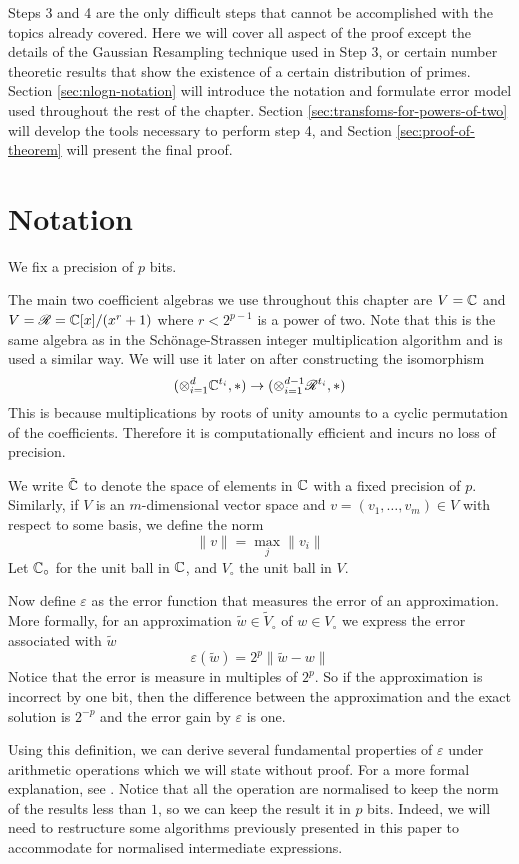 Steps 3 and 4 are the only difficult steps that cannot be accomplished with the topics already covered. Here we will cover all aspect of the proof except the details of the Gaussian Resampling technique used in Step 3, or certain number theoretic results that show the existence of a certain distribution of primes. Section \ref{sec:nlogn-notation} will introduce the notation and formulate error model used throughout the rest of the chapter. Section \ref{sec:transfoms-for-powers-of-two} will develop the tools necessary to perform step 4, and Section \ref{sec:proof-of-theorem} will present the final proof.

\section{Notation}%
\label{sec:Notation}

We fix a precision of $p$ bits.

The main two coefficient algebras we use throughout this chapter are $V = {\mathbb C}$ and $V = \mathscr{R} = {\mathbb C}[x]/(x^r + 1)$ where $r < 2^{p-1}$ is a power of two. Note that this is the same algebra as in the Sch\"{o}nage-Strassen integer multiplication algorithm and is used a similar way. We will use it later on after constructing the isomorphism
\[
    (\otimes^d_{i=1}{\mathbb C}^{t_i}, \ast) \to (\otimes_{i=1}^{d-1} \mathscr{R}^{t_i}, \ast)
\]
This is because multiplications by roots of unity amounts to a cyclic permutation of the coefficients. Therefore it is computationally efficient and incurs no loss of precision.

We write $\tilde{{\mathbb C}}$ to denote the space of elements in ${\mathbb C}$ with a fixed precision of $p$. Similarly, if $V$ is an $m$-dimensional vector space and $v = (v_1, \ldots, v_m) \in V$ with respect to some basis, we define the norm
\[
    \|v\| = \max_j \|v_i\|
\]
Let ${\mathbb C}_\circ$ for the unit ball in ${\mathbb C}$, and $V_\circ$ the unit ball in $V$.

Now define $\varepsilon$ as the error function that measures the error of an approximation. More formally, for an approximation $\tilde{w} \in \tilde{V}_\circ$ of $w \in V_\circ$ we express the error associated with $\tilde{w}$
\[
    \varepsilon(\tilde{w}) = 2^p \|\tilde{w} - w\|
\]
Notice that the error is measure in multiples of $2^p$. So if the approximation is incorrect by one bit, then the difference between the approximation and the exact solution is $2^{-p}$ and the error gain by $\varepsilon$ is one.

Using this definition, we can derive several fundamental properties of $\varepsilon$ under arithmetic operations which we will state without proof. For a more formal explanation, see \cite{nlogn}. Notice that all the operation are normalised to keep the norm of the results less than $1$, so we can keep the result it in $p$ bits. Indeed, we will need to restructure some algorithms previously presented in this paper to accommodate for normalised intermediate expressions.

